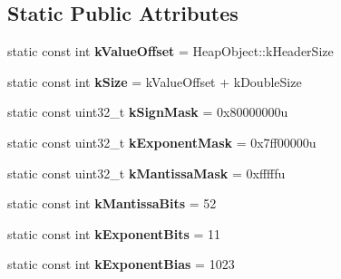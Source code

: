 \subsection*{Static Public Attributes}
\begin{DoxyCompactItemize}
\item 
static const int {\bfseries k\+Value\+Offset} = Heap\+Object\+::k\+Header\+Size\hypertarget{classv8_1_1internal_1_1_heap_number_a52b57ba48e6335c63496c78cd666c88b}{}\label{classv8_1_1internal_1_1_heap_number_a52b57ba48e6335c63496c78cd666c88b}

\item 
static const int {\bfseries k\+Size} = k\+Value\+Offset + k\+Double\+Size\hypertarget{classv8_1_1internal_1_1_heap_number_ab06326529091d16f4421faa17e04fb2a}{}\label{classv8_1_1internal_1_1_heap_number_ab06326529091d16f4421faa17e04fb2a}

\item 
static const uint32\+\_\+t {\bfseries k\+Sign\+Mask} = 0x80000000u\hypertarget{classv8_1_1internal_1_1_heap_number_a50eaa87f7bf62832731d20f644d4a33e}{}\label{classv8_1_1internal_1_1_heap_number_a50eaa87f7bf62832731d20f644d4a33e}

\item 
static const uint32\+\_\+t {\bfseries k\+Exponent\+Mask} = 0x7ff00000u\hypertarget{classv8_1_1internal_1_1_heap_number_a5fc3ecac0d194d03ccc4eabc9b3f5023}{}\label{classv8_1_1internal_1_1_heap_number_a5fc3ecac0d194d03ccc4eabc9b3f5023}

\item 
static const uint32\+\_\+t {\bfseries k\+Mantissa\+Mask} = 0xfffffu\hypertarget{classv8_1_1internal_1_1_heap_number_a53057546a7ea98c7bfab2a274f06079f}{}\label{classv8_1_1internal_1_1_heap_number_a53057546a7ea98c7bfab2a274f06079f}

\item 
static const int {\bfseries k\+Mantissa\+Bits} = 52\hypertarget{classv8_1_1internal_1_1_heap_number_a3a9f18d204db4321136c3263b54eadbd}{}\label{classv8_1_1internal_1_1_heap_number_a3a9f18d204db4321136c3263b54eadbd}

\item 
static const int {\bfseries k\+Exponent\+Bits} = 11\hypertarget{classv8_1_1internal_1_1_heap_number_a7badd159303921f42ed5c74ad7c9fa00}{}\label{classv8_1_1internal_1_1_heap_number_a7badd159303921f42ed5c74ad7c9fa00}

\item 
static const int {\bfseries k\+Exponent\+Bias} = 1023\hypertarget{classv8_1_1internal_1_1_heap_number_a87eae572809064057a6641c6b5805b42}{}\label{classv8_1_1internal_1_1_heap_number_a87eae572809064057a6641c6b5805b42}


\end{DoxyCompactItemize}
